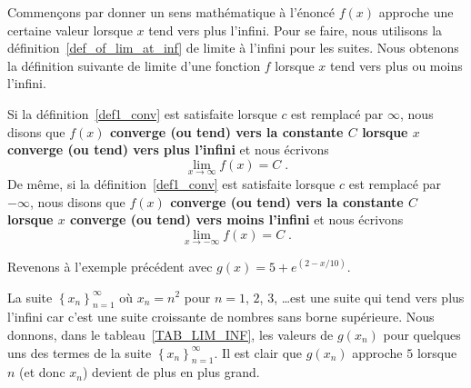 {

Commençons par donner un sens mathématique à l'énoncé \lgm $f(x)$
approche une certaine valeur lorsque $x$ tend vers plus l'infini\rgm.
Pour se faire, nous utilisons la définition~\ref{def_of_lim_at_inf} de
limite à l'infini pour les suites.  Nous obtenons la définition suivante
de limite d'une fonction $f$ lorsque $x$ tend vers plus ou moins
l'infini.

\begin{focus}{\dfn} 
Si la définition~\ref{def1_conv} est satisfaite lorsque $c$ est
remplacé par $\infty$, nous disons que {\bfseries $f(x)$ converge (ou tend)
vers la constante $C$ lorsque $x$ converge (ou tend) vers plus
l'infini} et nous écrivons
\[
\lim_{x\rightarrow \infty} f(x) = C \; .
\]
De même, si la définition~\ref{def1_conv} est satisfaite lorsque $c$
est remplacé par $-\infty$, nous disons que {\bfseries $f(x)$ converge (ou
tend) vers la constante $C$ lorsque $x$ converge (ou tend) vers moins
l'infini} et nous écrivons
\[
\lim_{x\rightarrow -\infty} f(x) = C \; .
\]
\label{def_of_lim_of_f_at_inf}
\end{focus}

\begin{egg}
Revenons à l'exemple précédent avec
$\displaystyle g(x) = 5 + e^{\left(2 - x/10\right)}$.

La suite $\displaystyle \left\{ x_n \right\}_{n=1}^\infty$ où
$x_n = n^2$ pour $n=1$, $2$, $3$, \ldots est une suite qui tend vers
plus l'infini car c'est une suite croissante de nombres sans borne
supérieure.  Nous donnons, dans le tableau~\ref{TAB_LIM_INF}, les valeurs
de $g(x_n)$ pour quelques uns des termes de la suite
$\displaystyle \left\{ x_n\right\}_{n=1}^\infty$.  Il est clair que
$g(x_n)$ approche $5$ lorsque $n$ (et donc $x_n$) devient de plus en
plus grand.


\end{egg}}
